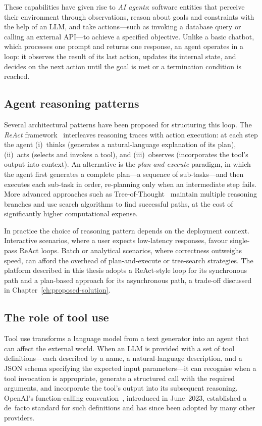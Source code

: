 \documentclass[a4paper,noexaminfo]{sapthesis}
\begin{document}
These capabilities have given rise to \emph{AI agents}: software entities
that perceive their environment through observations, reason about goals and
constraints with the help of an LLM, and take actions---such as invoking
a database query or calling an external API---to achieve a specified
objective.  Unlike a basic chatbot, which processes one prompt and returns
one response, an agent operates in a loop: it observes the result of its
last action, updates its internal state, and decides on the next action
until the goal is met or a termination condition is reached.

\subsection{Agent reasoning patterns}

Several architectural patterns have been proposed for structuring this
loop.  The \emph{ReAct} framework~\cite{yao2022react} interleaves
reasoning traces with action execution: at each step the agent (i)~thinks
(generates a natural-language explanation of its plan), (ii)~acts (selects
and invokes a tool), and (iii)~observes (incorporates the tool's output
into context).  An alternative is the \emph{plan-and-execute} paradigm,
in which the agent first generates a complete plan---a sequence of
sub-tasks---and then executes each sub-task in order, re-planning only
when an intermediate step fails.  More advanced approaches such as
Tree-of-Thought~\cite{yao2023tree} maintain multiple reasoning branches
and use search algorithms to find successful paths, at the cost of
significantly higher computational expense.

In practice the choice of reasoning pattern depends on the deployment
context.  Interactive scenarios, where a user expects low-latency
responses, favour single-pass ReAct loops.  Batch or analytical
scenarios, where correctness outweighs speed, can afford the overhead of
plan-and-execute or tree-search strategies.  The platform described in
this thesis adopts a ReAct-style loop for its synchronous path and a
plan-based approach for its asynchronous path, a trade-off discussed in
Chapter~\ref{ch:proposed-solution}.

\subsection{The role of tool use}

Tool use transforms a language model from a text generator into an agent
that can affect the external world.  When an LLM is provided with a set
of tool definitions---each described by a name, a natural-language
description, and a JSON schema specifying the expected input parameters---it
can recognise when a tool invocation is appropriate, generate a structured
call with the required arguments, and incorporate the tool's output into
its subsequent reasoning.  OpenAI's function-calling
convention~\cite{openai2023functions}, introduced in June~2023, established
a de~facto standard for such definitions and has since been adopted by many
other providers.
\end{document}
